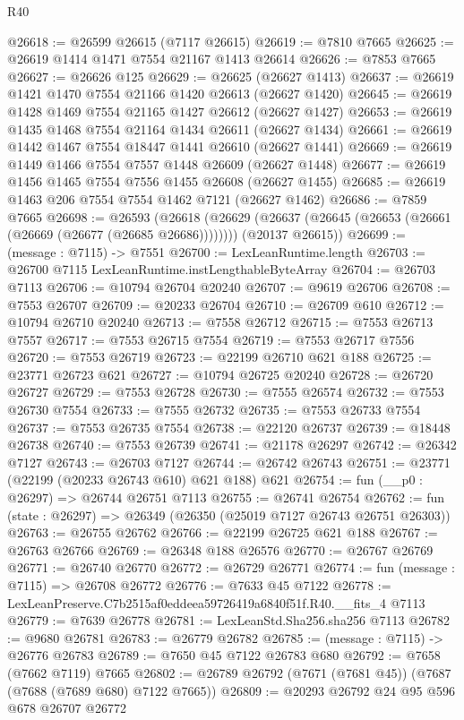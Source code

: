 \begin{lexlean}{R40}
\begin{coremodule}
@26618 := @26599 @26615 (@7117 @26615)
@26619 := @7810 @7665
@26625 := @26619 @1414 @1471 @7554 @21167 @1413 @26614
@26626 := @7853 @7665
@26627 := @26626 @125
@26629 := @26625 (@26627 @1413)
@26637 := @26619 @1421 @1470 @7554 @21166 @1420 @26613 (@26627 @1420)
@26645 := @26619 @1428 @1469 @7554 @21165 @1427 @26612 (@26627 @1427)
@26653 := @26619 @1435 @1468 @7554 @21164 @1434 @26611 (@26627 @1434)
@26661 := @26619 @1442 @1467 @7554 @18447 @1441 @26610 (@26627 @1441)
@26669 := @26619 @1449 @1466 @7554 @7557 @1448 @26609 (@26627 @1448)
@26677 := @26619 @1456 @1465 @7554 @7556 @1455 @26608 (@26627 @1455)
@26685 := @26619 @1463 @206 @7554 @7554 @1462 @7121 (@26627 @1462)
@26686 := @7859 @7665
@26698 := @26593
    (@26618
      (@26629 (@26637 (@26645 (@26653 (@26661 (@26669 (@26677 (@26685 @26686))))))))
      (@20137 @26615))
@26699 := (message : @7115) -> @7551
@26700 := LexLeanRuntime.length
@26703 := @26700 @7115 LexLeanRuntime.instLengthableByteArray
@26704 := @26703 @7113
@26706 := @10794 @26704 @20240
@26707 := @9619 @26706
@26708 := @7553 @26707
@26709 := @20233 @26704
@26710 := @26709 @610
@26712 := @10794 @26710 @20240
@26713 := @7558 @26712
@26715 := @7553 @26713 @7557
@26717 := @7553 @26715 @7554
@26719 := @7553 @26717 @7556
@26720 := @7553 @26719
@26723 := @22199 @26710 @621 @188
@26725 := @23771 @26723 @621
@26727 := @10794 @26725 @20240
@26728 := @26720 @26727
@26729 := @7553 @26728
@26730 := @7555 @26574
@26732 := @7553 @26730 @7554
@26733 := @7555 @26732
@26735 := @7553 @26733 @7554
@26737 := @7553 @26735 @7554
@26738 := @22120 @26737
@26739 := @18448 @26738
@26740 := @7553 @26739
@26741 := @21178 @26297
@26742 := @26342 @7127
@26743 := @26703 @7127
@26744 := @26742 @26743
@26751 := @23771 (@22199 (@20233 @26743 @610) @621 @188) @621
@26754 := fun (__p0 : @26297) => @26744 @26751 @7113
@26755 := @26741 @26754
@26762 := fun (state : @26297) => @26349 (@26350 (@25019 @7127 @26743 @26751 @26303))
@26763 := @26755 @26762
@26766 := @22199 @26725 @621 @188
@26767 := @26763 @26766
@26769 := @26348 @188 @26576
@26770 := @26767 @26769
@26771 := @26740 @26770
@26772 := @26729 @26771
@26774 := fun (message : @7115) => @26708 @26772
@26776 := @7633 @45 @7122
@26778 := LexLeanPreserve.C7b2515af0eddeea59726419a6840f51f.R40.__fits_4 @7113
@26779 := @7639 @26778
@26781 := LexLeanStd.Sha256.sha256 @7113
@26782 := @9680 @26781
@26783 := @26779 @26782
@26785 := (message : @7115) -> @26776 @26783
@26789 := @7650 @45 @7122 @26783 @680
@26792 := @7658 (@7662 @7119) @7665
@26802 := @26789 @26792 (@7671 (@7681 @45)) (@7687 (@7688 (@7689 @680) @7122 @7665))
@26809 := @20293 @26792 @24 @95 @596 @678 @26707 @26772

\end{coremodule}
\end{lexlean}
